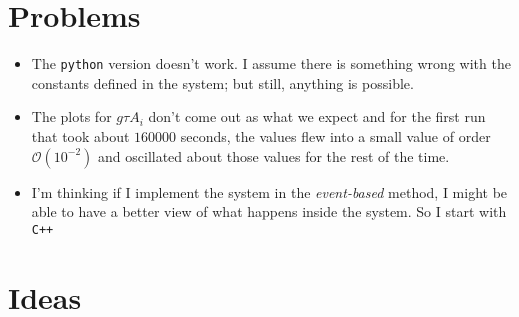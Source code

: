 \documentclass[a4paper, 12pt]{article}
\begin{document}
	\section{Problems}
	\begin{itemize}
		\item The \texttt{python} version doesn't work. I assume there is something
		wrong with the constants defined in the system; but still, anything is possible.
		
		\item The plots for $g\tau A_{i}$ don't come out as what we expect and for 
		the first run that took about $160000$ seconds, the values flew into a small 
		value of order $\mathcal{O}(10^{-2})$ and oscillated about those values for
		the rest of the time.
	\end{itemize}
	\begin{itemize}
		\item I'm thinking if I implement the system in the \textit{event-based} method,
		I might be able to have a better view of what happens inside the system. So I start 
		with \texttt{C++}
	\end{itemize}

	\section{Ideas}
	
\end{document}
